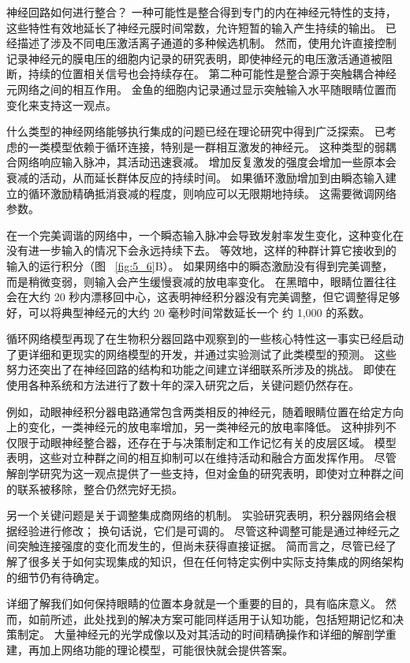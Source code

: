 神经回路如何进行整合？ 
一种可能性是整合得到专门的内在神经元特性的支持，这些特性有效地延长了神经元膜时间常数，允许短暂的输入产生持续的输出。
已经描述了涉及不同电压激活离子通道的多种候选机制。 
然而，使用允许直接控制记录神经元的膜电压的细胞内记录的研究表明，即使神经元的电压激活通道被阻断，持续的位置相关信号也会持续存在。 
第二种可能性是整合源于突触耦合神经元网络之间的相互作用。 
金鱼的细胞内记录通过显示突触输入水平随眼睛位置而变化来支持这一观点。


什么类型的神经网络能够执行集成的问题已经在理论研究中得到广泛探索。 
已考虑的一类模型依赖于循环连接，特别是一群相互激发的神经元。 
这种类型的弱耦合网络响应输入脉冲，其活动迅速衰减。 
增加反复激发的强度会增加一些原本会衰减的活动，从而延长群体反应的持续时间。
如果循环激励增加到由瞬态输入建立的循环激励精确抵消衰减的程度，则响应可以无限期地持续。 这需要微调网络参数。


在一个完美调谐的网络中，一个瞬态输入脉冲会导致发射率发生变化，这种变化在没有进一步输入的情况下会永远持续下去。 
等效地，这样的种群计算它接收到的输入的运行积分（图 ~\ref{fig:5_6}B）。 
如果网络中的瞬态激励没有得到完美调整，而是稍微变弱，则输入会产生缓慢衰减的放电率变化。 
在黑暗中，眼睛位置往往会在大约 20 秒内漂移回中心，这表明神经积分器没有完美调整，但它调整得足够好，可以将典型神经元的大约 20 毫秒时间常数延长一个 约 1,000 的系数。


循环网络模型再现了在生物积分器回路中观察到的一些核心特性这一事实已经启动了更详细和更现实的网络模型的开发，并通过实验测试了此类模型的预测。 
这些努力还突出了在神经回路的结构和功能之间建立详细联系所涉及的挑战。 
即使在使用各种系统和方法进行了数十年的深入研究之后，关键问题仍然存在。


例如，动眼神经积分器电路通常包含两类相反的神经元，随着眼睛位置在给定方向上的变化，一类神经元的放电率增加，另一类神经元的放电率降低。 
这种排列不仅限于动眼神经整合器，还存在于与决策制定和工作记忆有关的皮层区域。
模型表明，这些对立种群之间的相互抑制可以在维持活动和融合方面发挥作用。 
尽管解剖学研究为这一观点提供了一些支持，但对金鱼的研究表明，即使对立种群之间的联系被移除，整合仍然完好无损。


另一个关键问题是关于调整集成商网络的机制。 
实验研究表明，积分器网络会根据经验进行修改；
换句话说，它们是可调的。 
尽管这种调整可能是通过神经元之间突触连接强度的变化而发生的，但尚未获得直接证据。 
简而言之，尽管已经了解了很多关于如何实现集成的知识，但在任何特定实例中实际支持集成的网络架构的细节仍有待确定。


详细了解我们如何保持眼睛的位置本身就是一个重要的目的，具有临床意义。 
然而，如前所述，此处找到的解决方案可能同样适用于认知功能，包括短期记忆和决策制定。
大量神经元的光学成像以及对其活动的时间精确操作和详细的解剖学重建，再加上网络功能的理论模型，可能很快就会提供答案。



